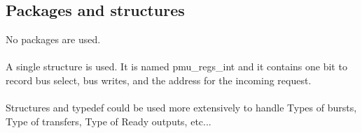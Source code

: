 \subsection{Packages and structures}

No packages are used.\\
\\
A single structure is used. It is named pmu\_regs\_int and it contains one bit to record bus select, bus  writes, and the address for the incoming request.\\
\\
Structures and typedef could be used more extensively to handle Types of bursts, Type of transfers, Type of Ready outputs, etc...


